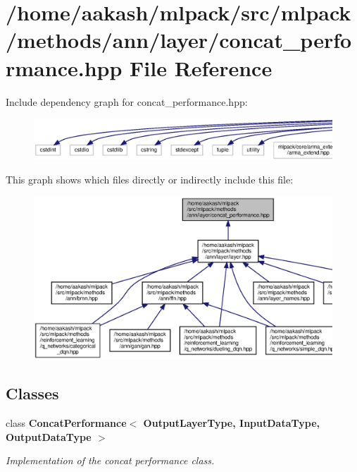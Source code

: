 \section{/home/aakash/mlpack/src/mlpack/methods/ann/layer/concat\+\_\+performance.hpp File Reference}
\label{concat__performance_8hpp}
Include dependency graph for concat\+\_\+performance.\+hpp\+:
\nopagebreak
\begin{figure}[H]
\begin{center}
\leavevmode
\includegraphics[width=350pt]{concat__performance_8hpp__incl}
\end{center}
\end{figure}
This graph shows which files directly or indirectly include this file\+:
\nopagebreak
\begin{figure}[H]
\begin{center}
\leavevmode
\includegraphics[width=350pt]{concat__performance_8hpp__dep__incl}
\end{center}
\end{figure}
\subsection*{Classes}
\begin{DoxyCompactItemize}
\item 
class \textbf{ Concat\+Performance$<$ Output\+Layer\+Type, Input\+Data\+Type, Output\+Data\+Type $>$}
\begin{DoxyCompactList}\small\item\em Implementation of the concat performance class. \end{DoxyCompactList}\end{DoxyCompactItemize}
